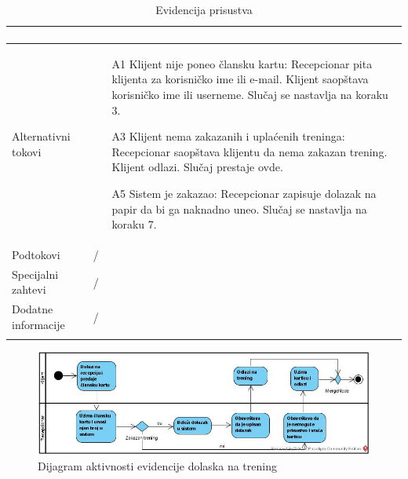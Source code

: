 \documentclass[../main.tex]{subfiles}
\begin{document}
\begin{longtable}{| p{} | p{} |}
\begin{enumerate}
    \end{enumerate}\\
\hline
    Alternativni tokovi & \begin{itemize}
        \item[A1] Klijent nije poneo člansku kartu: Recepcionar pita klijenta za korisničko ime ili e-mail. Klijent saopštava korisničko ime ili userneme. Slučaj se nastavlja na koraku 3.
        \item[A3] Klijent nema zakazanih i uplaćenih treninga: Recepcionar saopštava klijentu da nema zakazan trening. Klijent odlazi. Slučaj prestaje ovde.
        \item[A5]Sistem je zakazao: Recepcionar zapisuje dolazak na papir da bi ga naknadno uneo. Slučaj se nastavlja na koraku 7.
    \end{itemize}\\
\hline
    Podtokovi & /\\
\hline
    Specijalni zahtevi & /\\
\hline
    Dodatne informacije & /\\
\hline
\caption{Evidencija prisustva} %
\end{longtable}
 

\begin{figure}[!ht]
\begin{center}
\includegraphics[scale=0.55]{sections/images/dijagram_aktivnosti_evidencije_prisustva.jpg}
\end{center}
\caption{Dijagram aktivnosti evidencije dolaska na trening}
\label{fig:kontekst}
\end{figure}
\end{document}
